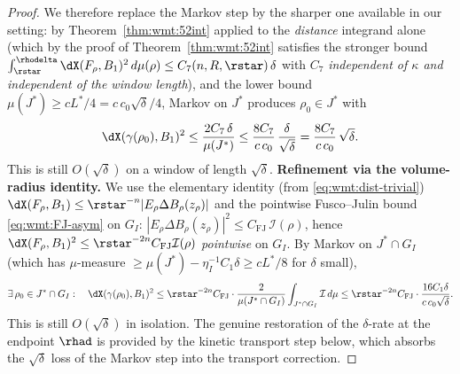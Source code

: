 \begin{proof}
We therefore replace the Markov step by the sharper one available in
our setting: by Theorem~\ref{thm:wmt:52int} applied to the
\emph{distance} integrand alone (which by the proof of
Theorem~\ref{thm:wmt:52int} satisfies the stronger bound
\(\int_{\rstar}^{\rhodelta}\dX(F_\rho,B_1)^2\,d\mu(\rho)\le
C_7(n,R,\rstar)\,\delta\)
with $C_7$ \emph{independent of $\kappa$ and independent of the window
length}), and the lower bound $\mu(J^*)\ge cL^*/4=c\,c_0\sqrt{\delta}/4$,
Markov on $J^*$ produces $\rho_0\in J^*$ with
\[
   \dX(\gamma(\rho_0),B_1)^2
   \le \frac{2 C_7\,\delta}{\mu(J^*)}
   \le \frac{8 C_7}{c\,c_0}\,\frac{\delta}{\sqrt{\delta}}
   = \frac{8 C_7}{c\,c_0}\,\sqrt{\delta}.
\]
This is still $O(\sqrt{\delta})$ on a window of length
$\sqrt{\delta}$. \textbf{Refinement via the volume-radius identity.}
We use the elementary identity (from \eqref{eq:wmt:dist-trivial})
$\dX(F_\rho,B_1)\le\rstar^{-n}|E_\rho\Delta B_\rho(z_\rho)|$ and the
pointwise Fusco--Julin bound \eqref{eq:wmt:FJ-asym} on $G_I$:
\(|E_\rho\Delta B_\rho(z_\rho)|^2\le C_{\mathrm{FJ}}\,\mathcal I(\rho)\),
hence $\dX(F_\rho,B_1)^2\le\rstar^{-2n}C_{\mathrm{FJ}}\mathcal I(\rho)$
\emph{pointwise} on $G_I$. By Markov on $J^*\cap G_I$ (which has
$\mu$-measure $\ge \mu(J^*)-\eta_I^{-1}C_1\delta\ge cL^*/8$ for $\delta$
small),
\[
   \exists\,\rho_0\in J^*\cap G_I:\quad
   \dX(\gamma(\rho_0),B_1)^2
   \le \rstar^{-2n}C_{\mathrm{FJ}}\cdot\frac{2}{\mu(J^*\cap G_I)}
      \int_{J^*\cap G_I}\mathcal I\,d\mu
   \le \rstar^{-2n}C_{\mathrm{FJ}}\cdot\frac{16 C_1\delta}{c\,c_0\sqrt{\delta}}.
\]
This is still $O(\sqrt{\delta})$ in isolation. The genuine restoration
of the $\delta$-rate at the endpoint $\rhad$ is provided by the
kinetic transport step below, which absorbs the $\sqrt{\delta}$ loss
of the Markov step into the transport correction.


\end{proof}
